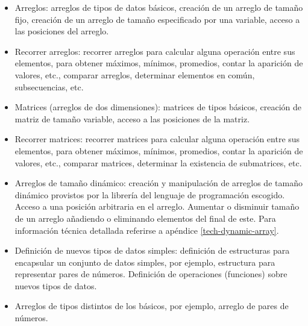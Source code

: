 
\begin{itemize}
\item[\basic{}] Arreglos: arreglos de tipos de datos básicos, creación de un
  arreglo de tamaño fijo, creación de un arreglo de tamaño especificado por una
  variable, acceso a las posiciones del arreglo.

\item[\basic{}] Recorrer arreglos: recorrer arreglos para calcular alguna operación entre
  sus elementos, para obtener máximos, mínimos, promedios, contar la aparición
  de valores, etc., comparar arreglos, determinar elementos en común,
  subsecuencias, etc.

\item[\basic{}] Matrices (arreglos de dos dimensiones): matrices de tipos
  básicos, creación de matriz de tamaño variable, acceso a las posiciones de la
  matriz.

\item[\basic{}] Recorrer matrices: recorrer matrices para calcular alguna operación entre
  sus elementos, para obtener máximos, mínimos, promedios, contar la aparición
  de valores, etc., comparar matrices, determinar la existencia de submatrices,
  etc.

\item[\basic{}] Arreglos de tamaño dinámico: creación y manipulación de arreglos
  de tamaño dinámico provistos por la librería del lenguaje de programación escogido.
  Acceso a una posición arbitraria en el arreglo.
  Aumentar o disminuir tamaño de un arreglo añadiendo o eliminando elementos del
  final de este.
  Para información técnica detallada referirse a apéndice \ref{tech-dynamic-array}.

\item[\advanced{}] Definición de nuevos tipos de datos simples:
  definición de estructuras para encapsular un conjunto de datos simples, por
  ejemplo, estructura para representar pares de números.
  Definición de operaciones (funciones) sobre nuevos tipos de datos.

\item[\advanced{}] Arreglos de tipos distintos de los básicos, por ejemplo,
  arreglo de pares de números.
\end{itemize}

